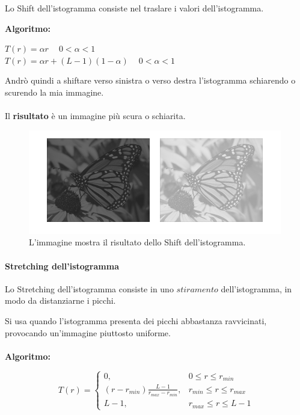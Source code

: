 \begin{definition}
    Lo Shift dell'istogramma consiste nel traslare i valori dell’istogramma.
\end{definition}
\textbf{Algoritmo:}

\begin{center}
    $T(r) = \alpha r$  $ \ \ \ \  0 < \alpha < 1$ \\
    $T(r) = \alpha r + (L-1)(1-\alpha)$ $\ \ \ \ 0<\alpha<1$
\end{center}

Andrò quindi a shiftare verso sinistra o verso destra l'istogramma schiarendo o
scurendo la mia immagine. \\\\
Il \textbf{risultato} è un immagine più scura o schiarita.

\begin{figure}[H]
    \centering
    \includegraphics[width=\linewidth, keepaspectratio]{capitoli/immagini/imgs/shift-isto.png}
    \caption{L'immagine mostra il risultato dello Shift dell'istogramma.}
\end{figure}

\paragraph{Stretching dell'istogramma}

\begin{definition}
    Lo Stretching dell'istogramma consiste in uno $stiramento$ dell'istogramma,
    in modo da distanziarne i picchi.
\end{definition}

Si usa quando l'istogramma presenta dei picchi abbastanza ravvicinati,
provocando un'immagine piuttosto uniforme. \\\\
\textbf{Algoritmo:}

$$
    T(r) =
    \begin{cases}
        0,                                         & 0 \le r \le r_{min}       \\
        (r - r_{min}) \frac{L-1}{r_{max}-r_{min}}, & r_{min} \le r \le r_{max} \\
        L-1,                                       & r_{max} \le r \le L-1
    \end{cases}
$$


